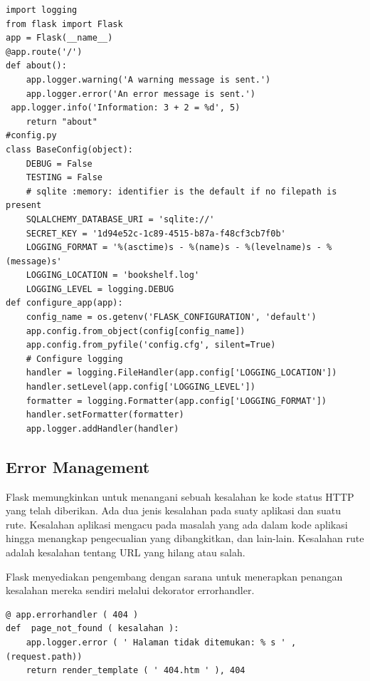 \begin{verbatim}
import logging
from flask import Flask
app = Flask(__name__)
@app.route('/')
def about():
    app.logger.warning('A warning message is sent.')
    app.logger.error('An error message is sent.')
 app.logger.info('Information: 3 + 2 = %d', 5)
    return "about"
#config.py
class BaseConfig(object):
    DEBUG = False
    TESTING = False
    # sqlite :memory: identifier is the default if no filepath is present
    SQLALCHEMY_DATABASE_URI = 'sqlite://'
    SECRET_KEY = '1d94e52c-1c89-4515-b87a-f48cf3cb7f0b'
    LOGGING_FORMAT = '%(asctime)s - %(name)s - %(levelname)s - %(message)s'
    LOGGING_LOCATION = 'bookshelf.log'
    LOGGING_LEVEL = logging.DEBUG
def configure_app(app):
    config_name = os.getenv('FLASK_CONFIGURATION', 'default')
    app.config.from_object(config[config_name])
    app.config.from_pyfile('config.cfg', silent=True)
    # Configure logging
    handler = logging.FileHandler(app.config['LOGGING_LOCATION'])
    handler.setLevel(app.config['LOGGING_LEVEL'])
    formatter = logging.Formatter(app.config['LOGGING_FORMAT'])
    handler.setFormatter(formatter)
    app.logger.addHandler(handler)
\end{verbatim}

\subsection{Error Management}
Flask memungkinkan untuk menangani sebuah kesalahan ke kode status HTTP yang telah diberikan. Ada dua jenis kesalahan pada suaty aplikasi dan suatu rute. Kesalahan aplikasi mengacu pada masalah yang ada dalam kode aplikasi hingga menangkap pengecualian yang dibangkitkan, dan lain-lain. Kesalahan rute adalah kesalahan tentang URL yang hilang atau salah.

Flask menyediakan pengembang dengan sarana untuk menerapkan penangan kesalahan mereka sendiri melalui dekorator errorhandler.
\begin{verbatim}
@ app.errorhandler ( 404 )
def  page_not_found ( kesalahan ):
	app.logger.error ( ' Halaman tidak ditemukan: % s ' , (request.path))
	return render_template ( ' 404.htm ' ), 404
 \end{verbatim}

